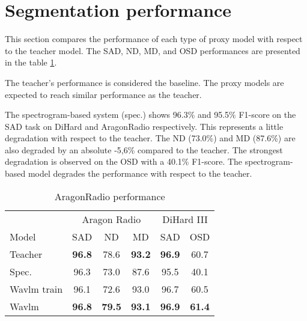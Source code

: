 \section{Segmentation performance}
\label{sect:perf}

This section compares the performance of each type of proxy model with respect to the teacher model.
The SAD, ND, MD, and OSD performances are presented in the table \ref*{tab:seg_results}.

The teacher's performance is considered the baseline.
The proxy models are expected to reach similar performance as the teacher.

The spectrogram-based system (spec.) shows 96.3\% and 95.5\% F1-score on the SAD task on DiHard and AragonRadio respectively.
This represents a little degradation with respect to the teacher.
The ND (73.0\%) and MD (87.6\%) are also degraded by an absolute -5,6\% compared to the teacher.
The strongest degradation is observed on the OSD with a 40.1\% F1-score.
The spectrogram-based model degrades the performance with respect to the teacher.

\begin{table}[ht]
    \centering
    \begin{tabular}{lccccc}
        \toprule
         & \multicolumn{3}{c}{Aragon Radio} & \multicolumn{2}{c}{DiHard III} \\
         \cmidrule{2-4}
         \cmidrule{5-6}
         Model & SAD & ND & MD & SAD & OSD \\  
         \midrule
         Teacher & \textbf{96.8} & 78.6 & \textbf{93.2} & \textbf{96.9} & 60.7\\
         \midrule
         Spec. & 96.3 & 73.0 &  87.6 & 95.5 & 40.1\\
         Wavlm train & 96.1 & 72.6 & 93.0 & 96.7 & 60.5\\
         Wavlm & \textbf{96.8} & \textbf{79.5} & \textbf{93.1} & \textbf{96.9} & \textbf{61.4} \\
         \bottomrule
    \end{tabular}
    \caption{AragonRadio performance}
    \label{tab:seg_results}
\end{table}

